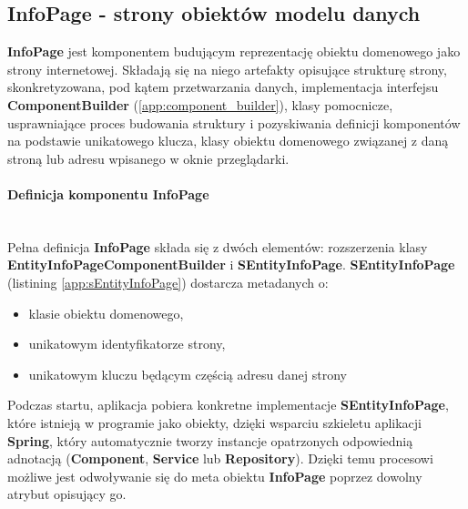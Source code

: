 \subsection{InfoPage - strony obiektów modelu danych}
	\textbf{InfoPage} jest komponentem budującym reprezentację obiektu domenowego jako strony internetowej. Składają się na niego artefakty opisujące strukturę strony, skonkretyzowana, pod kątem przetwarzania danych, implementacja interfejsu \textbf{ComponentBuilder} (\ref{app:component_builder}), klasy pomocnicze, usprawniające proces budowania struktury i pozyskiwania definicji komponentów na podstawie unikatowego klucza, klasy obiektu domenowego związanej z daną stroną lub adresu wpisanego w oknie przeglądarki. 
	
	\paragraph{Definicja komponentu InfoPage} \hspace{0pt} \\
	Pełna definicja \textbf{InfoPage} składa się z dwóch elementów: rozszerzenia klasy \textbf{EntityInfoPageComponentBuilder} i \textbf{SEntityInfoPage}. \textbf{SEntityInfoPage} (listining \ref{app:sEntityInfoPage}) dostarcza metadanych o:
	\begin{itemize}
		\item klasie obiektu domenowego,
		\item unikatowym identyfikatorze strony,
		\item unikatowym kluczu będącym częścią adresu danej strony
	\end{itemize}
	Podczas startu, aplikacja pobiera konkretne implementacje \textbf{SEntityInfoPage}, które istnieją w programie jako obiekty, dzięki wsparciu szkieletu aplikacji \textbf{Spring}, który automatycznie tworzy instancje opatrzonych odpowiednią adnotacją (\textbf{Component}, \textbf{Service} lub \textbf{Repository}). Dzięki temu procesowi możliwe jest odwoływanie się do meta obiektu \textbf{InfoPage} poprzez dowolny atrybut opisujący go. 
	\clearpage
	
